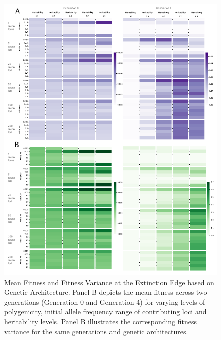 \documentclass{article}
\begin{document}
\begin{figure}[b]
    \centering
    \includegraphics[width=1\textwidth]{figures/meanfitness_varfitness_gen0to4.pdf}
    \caption{Mean Fitness and Fitness Variance at the Extinction Edge based on Genetic Architecture. Panel B depicts the mean fitness across two generations (Generation 0 and Generation 4) for varying levels of polygenicity, initial allele frequency range of contributing loci and heritability levels. Panel B illustrates the corresponding fitness variance for the same generations and genetic architectures.}
    \label{fig:meanfitness_varfitness_gen0to4}
\end{figure}
\end{document}

